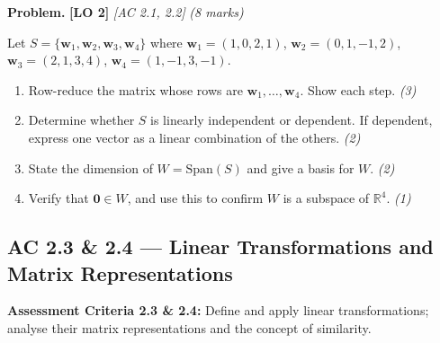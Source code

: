\documentclass[12pt,a4paper]{article}
\newcommand{\lo}[1]{\textcolor{locolor}{\textbf{[LO #1]}}}
\newcommand{\ac}[1]{\textcolor{locolor}{\textit{[AC #1]}}}
\newcommand{\R}{\mathbb{R}}
\begin{document}
	\begin{tcolorbox}[practice]
		\textbf{Problem.} \lo{2} \ac{2.1, 2.2} \hfill \textit{(8 marks)}
		
		Let $S = \{\mathbf{w}_1, \mathbf{w}_2, \mathbf{w}_3, \mathbf{w}_4\}$ where
		$\mathbf{w}_1=(1,0,2,1)$, $\mathbf{w}_2=(0,1,-1,2)$, $\mathbf{w}_3=(2,1,3,4)$, $\mathbf{w}_4=(1,-1,3,-1)$.
		
		\begin{enumerate}[label=(\alph*)]
			\item Row-reduce the matrix whose rows are $\mathbf{w}_1,\ldots,\mathbf{w}_4$. Show each step. \hfill\textit{(3)}
			\item Determine whether $S$ is linearly independent or dependent. If dependent, express one vector as a linear combination of the others. \hfill\textit{(2)}
			\item State the dimension of $W = \text{Span}(S)$ and give a basis for $W$. \hfill\textit{(2)}
			\item Verify that $\mathbf{0} \in W$, and use this to confirm $W$ is a subspace of $\R^4$. \hfill\textit{(1)}
		\end{enumerate}
	\end{tcolorbox}
	
	\begin{tcolorbox}[answer]
	\end{tcolorbox}
	
	\newpage
	
	\subsection{AC 2.3 \& 2.4 — Linear Transformations and Matrix Representations}
	
	\begin{tcolorbox}[subtopic]
		\textbf{Assessment Criteria 2.3 \& 2.4:} Define and apply linear transformations; analyse
		their matrix representations and the concept of similarity.
	\end{tcolorbox}
	
\end{document}
